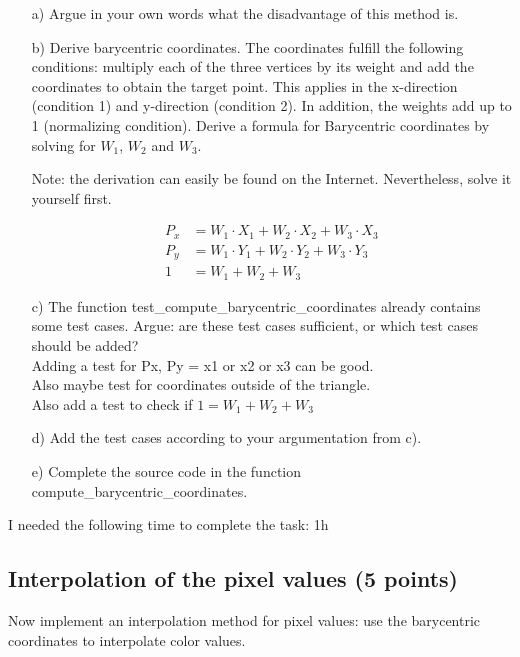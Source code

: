 \begin{enumerate}

\item[a)] Argue in your own words what the disadvantage of this method is.

\item[b)] Derive barycentric coordinates. The coordinates fulfill the following conditions: multiply each of the three vertices by its weight and add the coordinates to obtain the target point. This applies in the x-direction (condition 1) and y-direction (condition 2). In addition, the weights add up to 1 (normalizing condition). Derive a formula for
Barycentric coordinates by solving for $W_1$, $W_2$ and $W_3$.

Note: the derivation can easily be found on the Internet. Nevertheless, solve it yourself first.

\begin{align}
	P_x &= W_1 \cdot X_1 + W_2 \cdot X_2 + W_3 \cdot X_3 \\
	P_y &= W_1 \cdot Y_1 + W_2 \cdot Y_2 + W_3 \cdot Y_3 \\
	1 &= W_1 + W_2 + W_3
\end{align}

\item[c)] The function test\_compute\_barycentric\_coordinates already contains some test cases. Argue: are these test cases sufficient, or which test cases should be added? 
\\
Adding a test for Px, Py = x1 or x2 or x3 can be good. \\
Also maybe test for coordinates outside of the triangle. \\
Also add a test to check if $1 = W_1 + W_2 + W_3$

\item[d)] Add the test cases according to your argumentation from c). 

\item[e)] Complete the source code in the function compute\_barycentric\_coordinates. 

\end{enumerate}

I needed the following time to complete the task: 1h

\subsection{Interpolation of the pixel values (5 points)}

Now implement an interpolation method for pixel values: use the barycentric coordinates to interpolate color values. 

